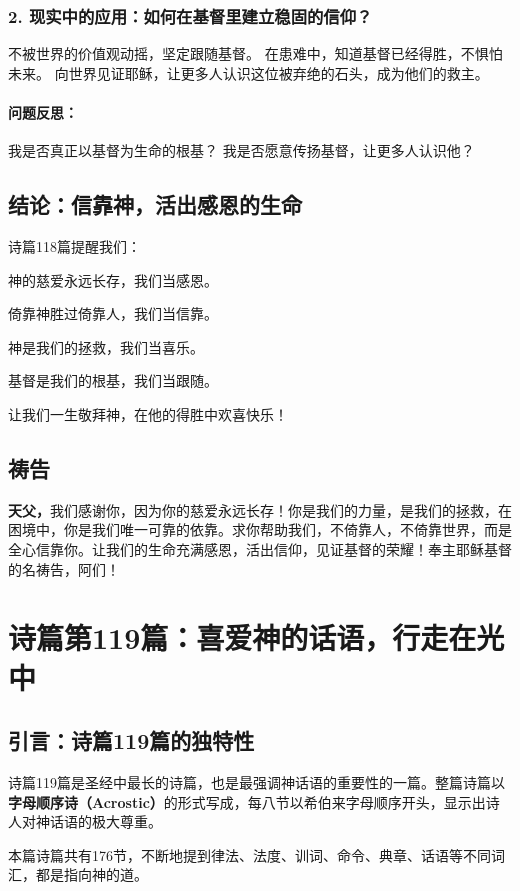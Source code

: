 \documentclass[a4paper, 12pt]{article}
\begin{document}
\subsubsection*{2. 现实中的应用：如何在基督里建立稳固的信仰？}
不被世界的价值观动摇，坚定跟随基督。
在患难中，知道基督已经得胜，不惧怕未来。
向世界见证耶稣，让更多人认识这位被弃绝的石头，成为他们的救主。
\paragraph*{问题反思：}

我是否真正以基督为生命的根基？
我是否愿意传扬基督，让更多人认识他？
\subsection*{结论：信靠神，活出感恩的生命}
诗篇118篇提醒我们：

神的慈爱永远长存，我们当感恩。

倚靠神胜过倚靠人，我们当信靠。

神是我们的拯救，我们当喜乐。

基督是我们的根基，我们当跟随。

让我们一生敬拜神，在他的得胜中欢喜快乐！

\subsection*{祷告}
\textbf{天父，}我们感谢你，因为你的慈爱永远长存！你是我们的力量，是我们的拯救，在困境中，你是我们唯一可靠的依靠。求你帮助我们，不倚靠人，不倚靠世界，而是全心信靠你。让我们的生命充满感恩，活出信仰，见证基督的荣耀！奉主耶稣基督的名祷告，阿们！
\newpage
\section{诗篇第119篇：喜爱神的话语，行走在光中}


\subsection*{引言：诗篇119篇的独特性}
\hspace{0.6cm}诗篇119篇是圣经中最长的诗篇，也是最强调神话语的重要性的一篇。整篇诗篇以\textbf{字母顺序诗（Acrostic）}的形式写成，每八节以希伯来字母顺序开头，显示出诗人对神话语的极大尊重。

本篇诗篇共有176节，不断地提到律法、法度、训词、命令、典章、话语等不同词汇，都是指向神的道。
\end{document}
